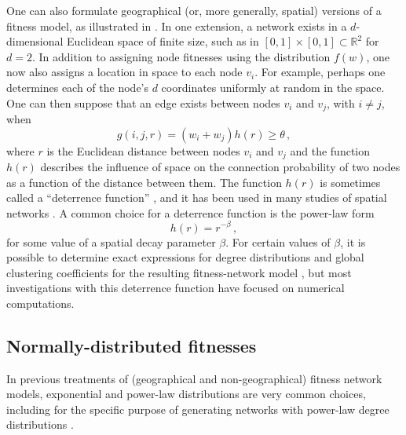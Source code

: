 \documentclass[%
 reprint,
 amsmath,amssymb,
 aps,
]{revtex4-1}
\begin{document}
One can also formulate geographical (or, more generally, spatial) versions of a fitness model, as illustrated in \cite{geographical_threshold, boguna, caldarelli}. In one extension, a network exists in a $d$-dimensional Euclidean space of finite size, such as in $[0, 1] \times [0, 1] \subset \mathbb{R}^2$ for $d = 2$. In addition to assigning node fitnesses using the distribution $f(w)$, one now also assigns a location in space to each node $v_i$. For example, perhaps one determines each of the node's $d$ coordinates uniformly at random in the space. One can then suppose that an edge exists between nodes $v_i$ and $v_j$, with $i \neq j$, when
\begin{equation}
	g(i, j, r) = (w_i + w_j)h(r) \geq \theta \,,
\end{equation}
where $r$ is the Euclidean distance between nodes $v_i$ and $v_j$ and the function $h(r)$ describes the influence of space on the connection probability of two nodes as a function of the distance between them. The function $h(r)$ is sometimes called a ``deterrence function'' \cite{barbosa}, and it has been used in many studies of spatial networks \cite{barthelemy}. A common choice for a deterrence function is the power-law form \cite{geographical_threshold}
\begin{equation}\label{distance_equation}
	h(r) = r^{-\beta}\,,
\end{equation}
for some value of a spatial decay parameter $\beta$. For certain values of $\beta$, it is possible to determine exact expressions for degree distributions and global clustering coefficients for the resulting fitness-network model \cite{geographical_threshold}, but most investigations with this deterrence function have focused on numerical computations. 



\subsection{Normally-distributed fitnesses}

In previous treatments of (geographical and non-geographical) fitness network models, exponential and power-law distributions are very common choices, including for the specific purpose of generating networks with power-law degree distributions \cite{geographical_threshold, geographical_threshold2, caldarelli, boguna}.
\end{document}
